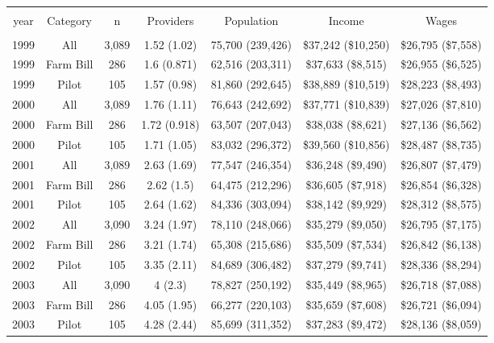 
\begin{table}[!htbp] \centering 
  \caption{} 
  \label{} 
\begin{tabular}{@{\extracolsep{5pt}} ccccccc} 
\\[-1.8ex]\hline 
\hline \\[-1.8ex] 
year & Category & n & Providers & Population & Income & Wages \\ 
\hline \\[-1.8ex] 
1999 & All & 3,089 & 1.52 (1.02) & 75,700 (239,426) & \$37,242 (\$10,250) & \$26,795 (\$7,558) \\ 
1999 & Farm Bill & 286 & 1.6 (0.871) & 62,516 (203,311) & \$37,633 (\$8,515) & \$26,955 (\$6,525) \\ 
1999 & Pilot & 105 & 1.57 (0.98) & 81,860 (292,645) & \$38,889 (\$10,519) & \$28,223 (\$8,493) \\ 
2000 & All & 3,089 & 1.76 (1.11) & 76,643 (242,692) & \$37,771 (\$10,839) & \$27,026 (\$7,810) \\ 
2000 & Farm Bill & 286 & 1.72 (0.918) & 63,507 (207,043) & \$38,038 (\$8,621) & \$27,136 (\$6,562) \\ 
2000 & Pilot & 105 & 1.71 (1.05) & 83,032 (296,372) & \$39,560 (\$10,856) & \$28,487 (\$8,735) \\ 
2001 & All & 3,089 & 2.63 (1.69) & 77,547 (246,354) & \$36,248 (\$9,490) & \$26,807 (\$7,479) \\ 
2001 & Farm Bill & 286 & 2.62 (1.5) & 64,475 (212,296) & \$36,605 (\$7,918) & \$26,854 (\$6,328) \\ 
2001 & Pilot & 105 & 2.64 (1.62) & 84,336 (303,094) & \$38,142 (\$9,929) & \$28,312 (\$8,575) \\ 
2002 & All & 3,090 & 3.24 (1.97) & 78,110 (248,066) & \$35,279 (\$9,050) & \$26,795 (\$7,175) \\ 
2002 & Farm Bill & 286 & 3.21 (1.74) & 65,308 (215,686) & \$35,509 (\$7,534) & \$26,842 (\$6,138) \\ 
2002 & Pilot & 105 & 3.35 (2.11) & 84,689 (306,482) & \$37,279 (\$9,741) & \$28,336 (\$8,294) \\ 
2003 & All & 3,090 & 4 (2.3) & 78,827 (250,192) & \$35,449 (\$8,965) & \$26,718 (\$7,088) \\ 
2003 & Farm Bill & 286 & 4.05 (1.95) & 66,277 (220,103) & \$35,659 (\$7,608) & \$26,721 (\$6,094) \\ 
2003 & Pilot & 105 & 4.28 (2.44) & 85,699 (311,352) & \$37,283 (\$9,472) & \$28,136 (\$8,059) \\ 

\end{tabular}
\end{table}
